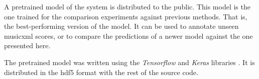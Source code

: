 
A pretrained model of the system is distributed to the
public. This model is the one trained for the comparison
experiments against previous methods. That is, the
best-performing version of the model. It can be used to
annotate unseen \gls{musicxml} scores, or to compare the
predictions of a newer model against the one presented here.

The pretrained model was written using the \emph{Tensorflow}
and \emph{Keras} libraries \parencite{abadi2016tensorflow,
chollet2021deep}. It is distributed in the \gls{hdf5} format
with the rest of the source
code. 
